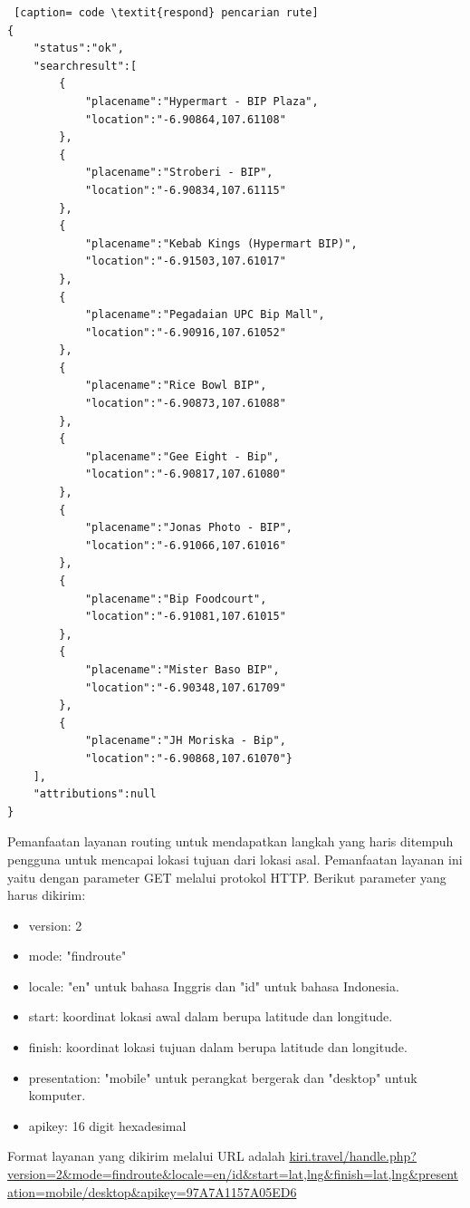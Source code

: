 \begin{lstlisting} [caption= code \textit{respond} pencarian rute]
{ 
	"status":"ok",
	"searchresult":[
		{
			"placename":"Hypermart - BIP Plaza",
			"location":"-6.90864,107.61108"
		},
		{
			"placename":"Stroberi - BIP",
			"location":"-6.90834,107.61115"
		},
		{
			"placename":"Kebab Kings (Hypermart BIP)",
			"location":"-6.91503,107.61017"
		},
		{
			"placename":"Pegadaian UPC Bip Mall",
			"location":"-6.90916,107.61052"
		},
		{
			"placename":"Rice Bowl BIP",
			"location":"-6.90873,107.61088"
		},
		{	
			"placename":"Gee Eight - Bip",
			"location":"-6.90817,107.61080"
		},
		{
			"placename":"Jonas Photo - BIP",
			"location":"-6.91066,107.61016"
		},
		{
			"placename":"Bip Foodcourt",
			"location":"-6.91081,107.61015"
		},
		{
			"placename":"Mister Baso BIP",
			"location":"-6.90348,107.61709"
		},
		{
			"placename":"JH Moriska - Bip",
			"location":"-6.90868,107.61070"}
	],
	"attributions":null
}
\end{lstlisting}

\hspace{0.5cm} Pemanfaatan layanan routing untuk mendapatkan langkah yang haris ditempuh pengguna untuk mencapai lokasi tujuan dari lokasi asal. Pemanfaatan layanan ini yaitu dengan parameter GET melalui protokol HTTP. Berikut parameter yang harus dikirim:
\begin{itemize}
	\item version: 2
	\item mode: "findroute"
	\item locale: "en" untuk bahasa Inggris dan "id" untuk bahasa Indonesia.
	\item start: koordinat lokasi awal dalam berupa latitude dan longitude.
	\item finish: koordinat lokasi tujuan dalam berupa latitude dan longitude.
	\item presentation: "mobile" untuk perangkat bergerak dan "desktop" untuk komputer.
	\item apikey: 16 digit hexadesimal
\end{itemize}

Format layanan yang dikirim melalui URL adalah \url{kiri.travel/handle.php?version=2&mode=findroute&locale=en/id&start=lat,lng&finish=lat,lng&presentation=mobile/desktop&apikey=97A7A1157A05ED6}

